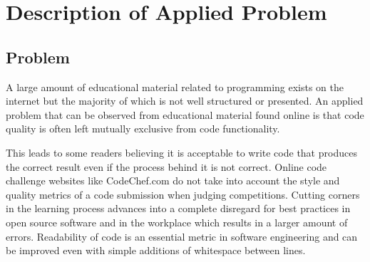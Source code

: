 \documentclass{article}
\begin{document}


\begin{abstract} 
{\bf NOTE this is very important stuff!!} this is an example of an abstract.this is an example of an abstract.this
is an example of an abstract.this is an example of an abstract.this is
an example of an abstract.this is an example of an abstract.this is an
example of an abstract.this is an example of an abstract.this is an
example of an abstract.this is an example of an abstract.this is an
example of an abstract. \end{abstract} 


\section{Description of Applied
Problem}\label{description-of-applied-problem}

\subsection{Problem}\label{problem}

A large amount of educational material related to programming exists on
the internet but the majority of which is not well structured or
presented. An applied problem that can be observed from educational
material found online is that code quality is often left mutually
exclusive from code functionality. \citet{justintimeteaching}

This leads to some readers believing it is acceptable to write code that
produces the correct result even if the process behind it is not
correct. Online code challenge websites like CodeChef.com do not take
into account the style and quality metrics of a code submission when
judging competitions. \citet{codechef} Cutting corners in the learning
process advances into a complete disregard for best practices in open
source software and in the workplace which results in a larger amount of
errors. Readability of code is an essential metric in software
engineering and can be improved even with simple additions of whitespace
between lines. \citet{codereadability}
\end{document}
